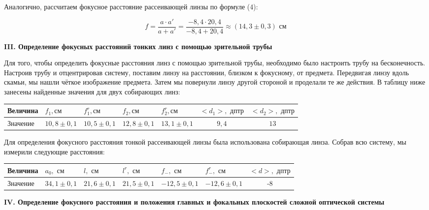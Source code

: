 \documentclass[a4paper,12pt]{report}
\begin{document}
Аналогично, рассчитаем фокусное расстояние рассеивающей линзы по формуле (4):

\begin{equation*}
    f = \frac{a\cdot a'}{a + a'} = \frac{-8,4 \cdot 20,4}{-8,4 + 20,4} \approx (14,3 \pm 0,3)\text{ см}
\end{equation*}

\vspace{\baselineskip}
\noindent\textbf{III. Определение фокусных расстояний тонких линз с помощью
зрительной трубы}

Для того, чтобы определить фокусные расстояния линз с помощью зрительной трубы, необходимо было настроить трубу на бесконечность. Настроив трубу и отцентрировав систему, поставим линзу на расстоянии, близком к фокусному, от предмета. Передвигая линзу вдоль скамьи, мы нашли чёткое изображение предмета. Затем мы повернули линзу другой стороной и проделали те же действия. В таблицу ниже занесены найденные значения для двух собирающих линз: 

\begin{table}[h!]
\centering
\begin{tabular}{|l|l|l|l|l|c|c|}
\hline
Величина & $f_{1},  \text{см}$ & $f_{1}^{r},  \text{см}$ & $f_{2},  \text{см}$ & $f_{2}^{r},  \text{см}$ & $<d_{1}>, \text{ дптр}$ & $<d_{2}>, \text{ дптр}$\\ \hline
Значение & $10,8\pm0,1$ & $10,5\pm0,1$  & $12,8\pm0,1$ & $13,1\pm0,1$ & $9,4$ & $13$ \\ \hline
\end{tabular}
\end{table}

\newpage
Для определения фокусного расстояния тонкой рассеивающей линзы была использована собирающая линза. Собрав всю систему, мы измерили следующие расстояния:

\begin{table}[h!]
\centering
\begin{tabular}{|l|l|l|l|l|l|c|}
\hline
Величина & $a_{0}, \text{ см}$           & $l, \text{ см}$           & $l^{r}, \text{ см}$           & $f_{-}, \text{ см}$            & $f_{-}^{r}, \text{ см}$ & $<d>, \text{ дптр}$          \\ \hline
Значение & $34,1\pm0,1$ & $21,6\pm0,1$ & $21,5\pm0,1$ & $-12,5\pm0,1$ & $-12,6\pm0,1$ & -8 \\ \hline
\end{tabular}
\end{table}

\noindent\textbf{IV. Определение фокусного расстояния и положения главных и
фокальных плоскостей сложной оптической системы}
\end{document}
